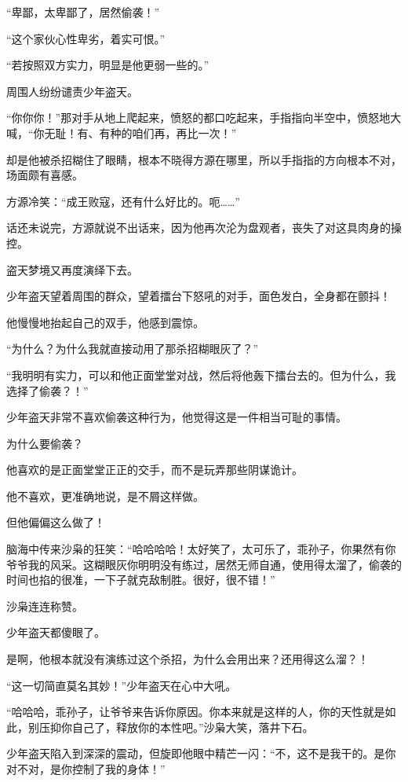 
\begin{this_body}

“卑鄙，太卑鄙了，居然偷袭！”

“这个家伙心性卑劣，着实可恨。”

“若按照双方实力，明显是他更弱一些的。”

周围人纷纷谴责少年盗天。

“你你你！”那对手从地上爬起来，愤怒的都口吃起来，手指指向半空中，愤怒地大喊，“你无耻！有、有种的咱们再，再比一次！”

却是他被杀招糊住了眼睛，根本不晓得方源在哪里，所以手指指的方向根本不对，场面颇有喜感。

方源冷笑：“成王败寇，还有什么好比的。呃……”

话还未说完，方源就说不出话来，因为他再次沦为盘观者，丧失了对这具肉身的操控。

盗天梦境又再度演绎下去。

少年盗天望着周围的群众，望着擂台下怒吼的对手，面色发白，全身都在颤抖！

他慢慢地抬起自己的双手，他感到震惊。

“为什么？为什么我就直接动用了那杀招糊眼灰了？”

“我明明有实力，可以和他正面堂堂对战，然后将他轰下擂台去的。但为什么，我选择了偷袭？！”

少年盗天非常不喜欢偷袭这种行为，他觉得这是一件相当可耻的事情。

为什么要偷袭？

他喜欢的是正面堂堂正正的交手，而不是玩弄那些阴谋诡计。

他不喜欢，更准确地说，是不屑这样做。

但他偏偏这么做了！

脑海中传来沙枭的狂笑：“哈哈哈哈！太好笑了，太可乐了，乖孙子，你果然有你爷爷我的风采。这糊眼灰你明明没有练过，居然无师自通，使用得太溜了，偷袭的时间也掐的很准，一下子就克敌制胜。很好，很不错！”

沙枭连连称赞。

少年盗天都傻眼了。

是啊，他根本就没有演练过这个杀招，为什么会用出来？还用得这么溜？！

“这一切简直莫名其妙！”少年盗天在心中大吼。

“哈哈哈，乖孙子，让爷爷来告诉你原因。你本来就是这样的人，你的天性就是如此，别压抑你自己了，释放你的本性吧。”沙枭大笑，落井下石。

少年盗天陷入到深深的震动，但旋即他眼中精芒一闪：“不，这不是我干的。是你对不对，是你控制了我的身体！”


\end{this_body}
